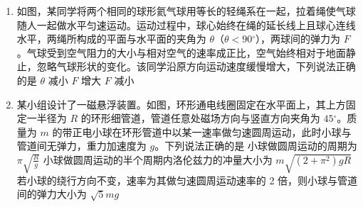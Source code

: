 \documentclass[\gkver]{gaokaozhenti}
\begin{document}
\begin{enumerate}
{B．一定量的水变为同温度的水蒸气，温度不变则分子总动能不变。汽化过程吸收热量，且汽化后分子间距大幅增大，分子势能增加，因此总内能变大，故 B 正确；

C．该过程中，均热板从高温的芯片吸热，向低温的冷凝端放热，整个过程循环进行，均热板自身状态复原，不需要对外界做功，仅依靠水传递热量，符合物理规律，故 C 正确；

D．根据热力学第二定律，不可能从低温物体吸热、向高温物体放热，同时不产生其他影响，该描述违反热力学第二定律，故 D 错误。

故选 BC。
}
\item
如图，某同学将两个相同的球形氦气球用等长的轻绳系在一起，拉着绳使气球随人一起做水平匀速运动。运动过程中，球心始终在绳的延长线上且球心连线水平，两绳所构成的平面与水平面的夹角为 $\theta$（$\theta < 90{^\circ}$），两球间的弹力为 $F$。气球受到空气阻力的大小与相对空气的速率成正比，空气始终相对于地面静止，忽略气球形状的变化。该同学沿原方向运动速度缓慢增大，下列说法正确的是 
\onepicture[w=4.2cm]{}
{$\theta$ 减小}
{$F$ 增大}
{$F$ 减小}
\item
某小组设计了一磁悬浮装置。如图，环形通电线圈固定在水平面上，其上方固定一半径为 $R$ 的环形细管道，管道任意处磁场方向与竖直方向夹角为 $45{^\circ}$。质量为 $m$ 的带正电小球在环形管道中以某一速率做匀速圆周运动，此时小球与管道间无弹力，重力加速度为 $g$。下列说法正确的是 
\onepicture[w=5.5cm]{}
{小球做圆周运动的周期为 $\pi\sqrt{\frac{R}{g}}$}
{小球做圆周运动的半个周期内洛伦兹力的冲量大小为 $m\sqrt{(2 + \pi^{2})gR}$}
{若小球的绕行方向不变，速率为其做匀速圆周运动速率的 2 倍，则小球与管道间的弹力大小为 $\sqrt{5}mg$}
\end{enumerate}
\end{document}
